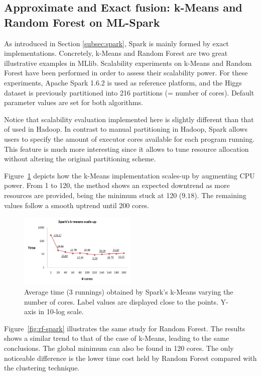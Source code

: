 \documentclass[3p,review]{elsarticle}
\begin{document}
	\subsection{Approximate and Exact fusion: k-Means and Random Forest on ML-Spark}
	\label{subsec:rfspark}
	
	As introduced in Section \ref{subsec:spark}, Spark is mainly formed by exact implementations. Concretely, k-Means and Random Forest are two great illustrative examples in MLlib. Scalability experiments on k-Means and Random Forest have been performed in order to assess their scalability power. For these experiments, Apache Spark 1.6.2 is used as reference platform, and the Higgs dataset is previously partitioned into 216 partitions (= number of cores). Default parameter values are set for both algorithms.
	
	Notice that scalability evaluation implemented here is slightly different than that of used in Hadoop. In contrast to manual partitioning in Hadoop, Spark allows users to specify the amount of executor cores available for each program running. This feature is much more interesting since it allows to tune resource allocation without altering the original partitioning scheme.
	
	Figure~\ref{fig:kmeans-spark} depicts how the k-Means implementation scales-up by augmenting CPU power. From 1 to 120, the method shows an expected downtrend as more resources are provided, being the minimum stuck at 120 ($9.18$). The remaining values follow a smooth uptrend until 200 cores. 
	
	\begin{figure}[!htp]
		\centering
		\includegraphics[width=0.5\textwidth]{kmeans-spark}
		\caption{Average time (3 runnings) obtained by Spark's k-Means varying the number of cores. Label values are displayed close to the points. Y-axis in 10-log scale.}
		\label{fig:kmeans-spark}
	\end{figure}
	
	Figure~\ref{fig:rf-spark} illustrates the same study for Random Forest. The results shows a similar trend to that of the case of k-Means, leading to the same conclusions. The global minimum can also be found in 120 cores. The only noticeable difference is the lower time cost held by Random Forest compared with the clustering technique.
	
\end{document}
